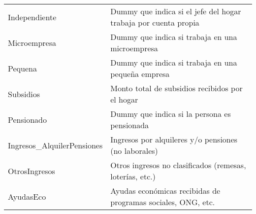 \begin{table}[htbp]
\begin{tabular}{p{4cm}p{9cm}}
Independiente & Dummy que indica si el jefe del hogar trabaja por cuenta propia \\
Microempresa & Dummy que indica si trabaja en una microempresa \\
Pequena & Dummy que indica si trabaja en una pequeña empresa \\
Subsidios & Monto total de subsidios recibidos por el hogar \\
Pensionado & Dummy que indica si la persona es pensionada \\
Ingresos\_AlquilerPensiones & Ingresos por alquileres y/o pensiones (no laborales) \\
OtrosIngresos & Otros ingresos no clasificados (remesas, loterías, etc.) \\
AyudasEco & Ayudas económicas recibidas de programas sociales, ONG, etc. \\
\bottomrule
\end{tabular}
\end{table}
